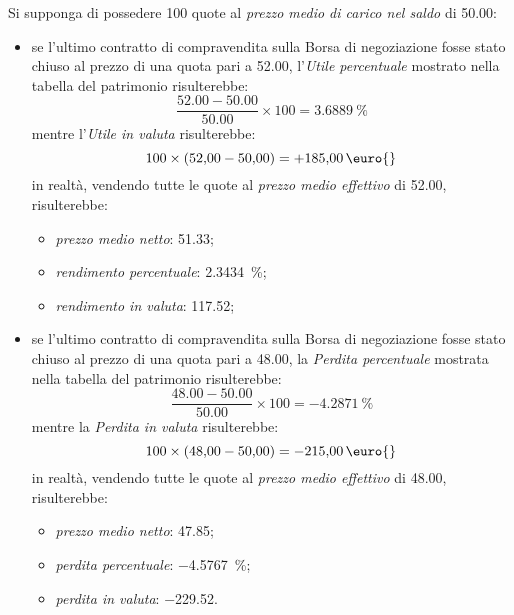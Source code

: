 \documentclass[12pt,a4paper]{article}
\newcommand{\Eur}[1]{\qty{#1}{\text{\euro{}}}}
\newcommand{\CalcoloRendimentoPercentuale}[2]{\frac{\num{#1} - \num{#2}}{\num{#2}} \times{} \num{100}}
\begin{document}
Si supponga di possedere \num{100} quote al \emph{prezzo medio di carico nel saldo} di \Eur{50,00}:
\begin{itemize}
\item se  l'ultimo contratto  di compravendita  sulla Borsa  di negoziazione  fosse stato  chiuso al
  prezzo di  una quota  pari a  \Eur{52,00}, l'\emph{Utile percentuale}  mostrato nella  tabella del
  patrimonio risulterebbe:
  \begin{equation*}
    \CalcoloRendimentoPercentuale{52,00}{50,00} = \qty{+3,6889}{\percent}
  \end{equation*}
  mentre l'\emph{Utile in valuta} risulterebbe:
  \begin{equation*}
    \num{100} \times{} (\num{52,00} - \num{50,00}) = \Eur{+185,00}
  \end{equation*}
  in realtà, vendendo tutte le quote al \emph{prezzo medio effettivo} di \Eur{52,00}, risulterebbe:
  \begin{itemize}
  \item \emph{prezzo medio netto}: \Eur{51,33};
  \item \emph{rendimento percentuale}: \qty{+2,3434}{\percent};
  \item \emph{rendimento in valuta}: \Eur{+117,52};
  \end{itemize}

\item se  l'ultimo contratto  di compravendita  sulla Borsa  di negoziazione  fosse stato  chiuso al
  prezzo di una quota  pari a \Eur{48,00}, la \emph{Perdita percentuale}  mostrata nella tabella del
  patrimonio risulterebbe:
  \begin{equation*}
    \CalcoloRendimentoPercentuale{48,00}{50,00} = \qty{-4,2871}{\percent}
  \end{equation*}
  mentre la \emph{Perdita in valuta} risulterebbe:
  \begin{equation*}
    \num{100} \times{} (\num{48,00} - \num{50,00}) = \Eur{-215,00}
  \end{equation*}
  in realtà, vendendo tutte le quote al \emph{prezzo medio effettivo} di \Eur{48,00}, risulterebbe:
  \begin{itemize}
  \item \emph{prezzo medio netto}: \Eur{47,85};
  \item \emph{perdita percentuale}: \qty{-4,5767}{\percent};
  \item \emph{perdita in valuta}: \Eur{-229,52}.
  \end{itemize}
\end{itemize}
\end{document}
